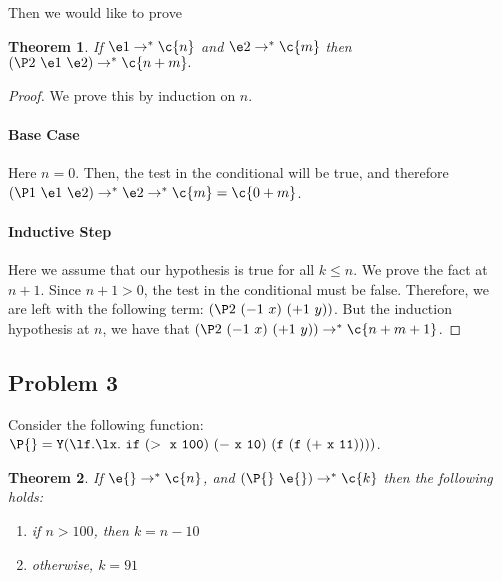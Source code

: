 \documentclass{article}
\newtheorem{theorem}{Theorem}
\begin{document}
Then we would like to prove

\begin{theorem}
If $\e1 \rightarrow^* \c{n}$ and $\e2 \rightarrow^* \c{m}$ then $(\P2\
\e1\ \e2) \rightarrow^* \c{n+m}.$
\end{theorem}

\begin{proof}
  We prove this by induction on $n$.  

\paragraph{Base Case}  Here $n=0$.  Then, the test in the conditional
will be true, and therefore $(\P1\
\e1\ \e2) \rightarrow^* \e2 \rightarrow^* \c{m} = \c{0+m}$.

\paragraph{Inductive Step} Here we assume that our hypothesis is true
for all $k \leq n$.  We prove the fact at $n+1$.  Since $n+1 > 0$, the
test in the conditional must be false.  Therefore, we are left with
the following term: $(\P2\ (-1\ x)\ (+1\ y))$.  But the induction
hypothesis at $n$, we have that $(\P2\ (-1\ x)\ (+1\ y)) \rightarrow^*
\c{n+m+1}$.  

\end{proof}

\newcommand\red{\rightarrow^*} 
\newcommand\app[2]{(#1\ #2)}
\newcommand\PP[1]{\app{\P{}}{#1}}

\newpage

\subsection*{Problem 3}

Consider the following function: $\P{} = \mathtt{Y(\l f.\l x.\ if\ (>\
  x\ 100)\ (-\ x\ 10)\ (f\ (f\ (+\ x\ 11))))}$.

\begin{theorem}
   If $\e{} \red \c{n}$, and $\PP{\e{}} \red \c{k}$ then the following holds:
   \begin{enumerate}
   \item if $n > 100$, then $k = n-10$
   \item otherwise, $k = 91$ 
   \end{enumerate}


\end{theorem}
\end{document}
